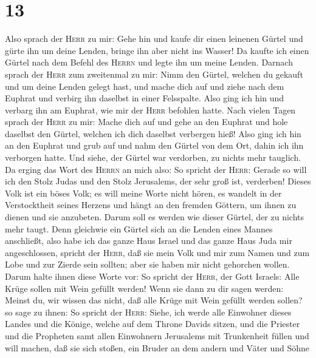 \hypertarget{section-12}{%
\section{13}\label{section-12}}

 Also sprach der \textsc{Herr} zu mir: Gehe hin und kaufe
dir einen leinenen Gürtel und gürte ihn um deine Lenden, bringe ihn aber
nicht ins Wasser!  Da kaufte ich einen Gürtel nach dem
Befehl des \textsc{Herrn} und legte ihn um meine Lenden. 
Darnach sprach der \textsc{Herr} zum zweitenmal zu mir: 
Nimm den Gürtel, welchen du gekauft und um deine Lenden gelegt hast, und
mache dich auf und ziehe nach dem Euphrat und verbirg ihn daselbst in
einer Felsspalte.  Also ging ich hin und verbarg ihn am
Euphrat, wie mir der \textsc{Herr} befohlen hatte.  Nach
vielen Tagen sprach der \textsc{Herr} zu mir: Mache dich auf und gehe an
den Euphrat und hole daselbst den Gürtel, welchen ich dich daselbst
verbergen hieß!  Also ging ich hin an den Euphrat und grub
auf und nahm den Gürtel von dem Ort, dahin ich ihn verborgen hatte. Und
siehe, der Gürtel war verdorben, zu nichts mehr tauglich. 
Da erging das Wort des \textsc{Herrn} an mich also:  So
spricht der \textsc{Herr}: Gerade so will ich den Stolz Judas und den
Stolz Jerusalems, der sehr groß ist, verderben!  Dieses
Volk ist ein böses Volk; es will meine Worte nicht hören, es wandelt in
der Verstocktheit seines Herzens und hängt an den fremden Göttern, um
ihnen zu dienen und sie anzubeten. Darum soll es werden wie dieser
Gürtel, der zu nichts mehr taugt.  Denn gleichwie ein
Gürtel sich an die Lenden eines Mannes anschließt, also habe ich das
ganze Haus Israel und das ganze Haus Juda mir angeschlossen, spricht der
\textsc{Herr}, daß sie mein Volk und mir zum Namen und zum Lobe und zur
Zierde sein sollten; aber sie haben mir nicht gehorchen wollen.
 Darum halte ihnen diese Worte vor: So spricht der
\textsc{Herr}, der Gott Israels: Alle Krüge sollen mit Wein gefüllt
werden! Wenn sie dann zu dir sagen werden: Meinst du, wir wissen das
nicht, daß alle Krüge mit Wein gefüllt werden sollen? so sage zu ihnen:
 So spricht der \textsc{Herr}: Siehe, ich werde alle
Einwohner dieses Landes und die Könige, welche auf dem Throne Davids
sitzen, und die Priester und die Propheten samt allen Einwohnern
Jerusalems mit Trunkenheit füllen und will machen,  daß
sie sich stoßen, ein Bruder an dem andern und Väter und Söhne

